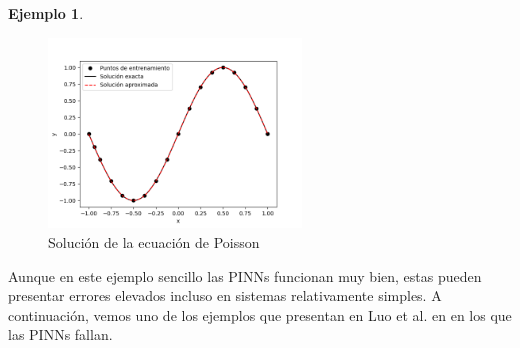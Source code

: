 \documentclass[a4paper,11pt,spanish, twoside, leqno]{tfg-uam}
\theoremstyle{definition}
\newtheorem{exmp}[teor]{Ejemplo}
\begin{document}
\begin{mdframed}
\begin{exmp}
    \begin{figure}[H] 
        \centering
        \includegraphics[width=0.6\textwidth]{Figuras/Poisson.png}
        \caption{Solución de la ecuación de Poisson}
        \label{fig:poisson_PINN}
    \end{figure}
\end{exmp}
\end{mdframed}

Aunque en este ejemplo sencillo las PINNs funcionan muy bien, estas pueden presentar errores elevados incluso en sistemas relativamente simples. A continuación, vemos uno de los ejemplos que presentan en Luo et al. en \cite{luo2023residualminimizationpdesfailure} en los que las PINNs fallan.
\end{document}

